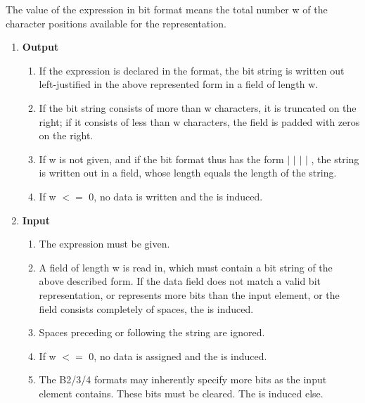 The value of the expression in bit format means the total number w of
the character positions available for the representation.
\begin{enumerate}
\item {\bf Output}\\
\begin{enumerate}
\item If the expression is declared in the format, the bit string is written
out left-justified in the above represented form in a field of length
w. 
\item If the bit string consists of more than w characters, it is truncated
on the right; if it consists of less than w characters, the field is
padded with zeros on the right. 
\item If w is not given, and if the bit format
thus has the form  $\mid$  $\mid$  $\mid$
	  $\mid$ , the string
is written out in a field, whose length equals the length of the
string.
\item If w $<=$ 0, no data is written and the  is induced.
\end{enumerate}
\item {\bf Input}\\
\begin{enumerate}
\item The expression must be given.
\item A field of length w is read in, which must contain a bit string of the
above described form.
If the data field does not match a valid bit representation,
    or represents more bits than the input element, 
   or the field consists completely of spaces,
the  is induced.
\item Spaces preceding or following the string are ignored.

\item If w $<=$ 0, no data is assigned and the  is induced.
\item The B2/3/4 formats may inherently specify more bits as the input element contains. 
   These bits must be cleared. The  is induced else. 
\end{enumerate}
\end{enumerate}


